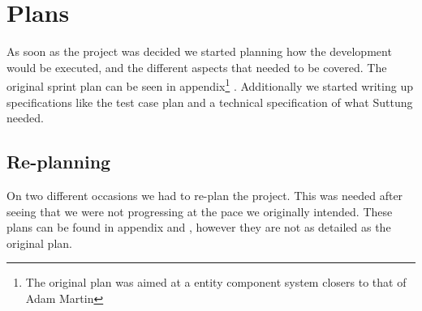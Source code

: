 \section{Plans}
As soon as the project was decided we started planning how the development would
be executed, and the different aspects that needed to be covered.
The original sprint plan can be seen in appendix\footnote{The original plan was aimed at a entity component system closers to that of Adam Martin\protect\cite{t_machine_entity_systems}} .
Additionally we started writing up specifications like the test case plan 
and a technical specification of what Suttung needed.

\subsection{Re-planning}
On two different occasions we had to re-plan the project.
This was needed after seeing that we were not progressing at the pace we originally
intended.
These plans can be found in appendix  and , however they are not as
detailed as the original plan.
